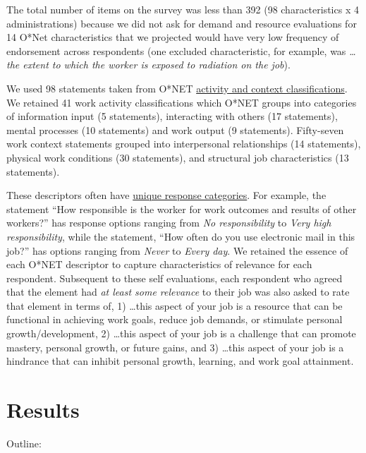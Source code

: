 \documentclass[
  man]{apa6}
\begin{document}
The total number of items on the survey was less than 392 (98 characteristics x 4 administrations) because we did not ask for demand and resource evaluations for 14 O*Net characteristics that we projected would have very low frequency of endorsement across respondents (one excluded characteristic, for example, was \emph{\ldots the extent to which the worker is exposed to radiation on the job}).

We used 98 statements taken from O*NET \href{https://www.ONETonline.org/find/descriptor/result/4.A.1.b.3}{activity and context classifications}. We retained 41 work activity classifications which O*NET groups into categories of information input (5 statements), interacting with others (17 statements), mental processes (10 statements) and work output (9 statements). Fifty-seven work context statements grouped into interpersonal relationships (14 statements), physical work conditions (30 statements), and structural job characteristics (13 statements).

These descriptors often have \href{https://www.ONETonline.org/find/descriptor/result/4.C.1.c.2}{unique response categories}. For example, the statement ``How responsible is the worker for work outcomes and results of other workers?'' has response options ranging from \emph{No responsibility} to \emph{Very high responsibility}, while the statement, ``How often do you use electronic mail in this job?'' has options ranging from \emph{Never} to \emph{Every day}. We retained the essence of each O*NET descriptor to capture characteristics of relevance for each respondent. Subsequent to these self evaluations, each respondent who agreed that the element had \emph{at least some relevance} to their job was also asked to rate that element in terms of, 1) \ldots this aspect of your job is a resource that can be functional in achieving work goals, reduce job demands, or stimulate personal growth/development, 2) \ldots this aspect of your job is a challenge that can promote mastery, personal growth, or future gains, and 3) \ldots this aspect of your job is a hindrance that can inhibit personal growth, learning, and work goal attainment.

\hypertarget{results}{%
\section{Results}\label{results}}

Outline:
\end{document}
